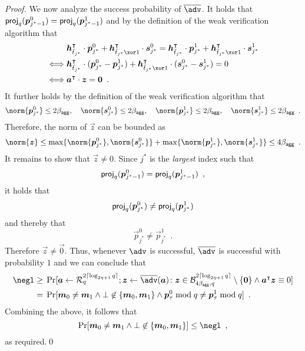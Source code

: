 \begin{proof}
  We now analyze the success probability of $\sisadv$.
  It holds that $\mathsf{proj}_{q}(\boldsymbol{p}_{j^*-1}^0) = \mathsf{proj}_{q}(\boldsymbol{p}_{j^*-1}^1)$ and by the definition of the weak verification algorithm that
  \begin{align*}
    &\vec{h}_{\tilde t_{j^*}}^\transpose\cdot\vec{p}_{j^*}^0 + \vec{h}_{\tilde t_{j^*}\xor 1}^\transpose\cdot\vec{s}_{j^*}^0 = \vec{h}_{\tilde t_{j^*}}^\transpose\cdot\vec{p}_{j^*}^1 + \vec{h}_{\tilde t_{j^*}\xor 1}^\transpose\cdot\vec{s}_{j^*}^1\\
    \iff&\vec{h}_{\tilde t_{j^*}}^\transpose\cdot(\vec{p}_{j^*}^0-\vec{p}_{j^*}^1) + \vec{h}_{\tilde t_{j^*}\xor 1}^\transpose\cdot(\vec{s}_{j^*}^0-\vec{s}_{j^*}^1) = 0\\
    \iff&\vec{a}^\transpose\cdot\vec{z} = \vec{0} \enspace.
  \end{align*}
  It further holds by the definition of the weak verification algorithm that 
  \[
  \norm{\vec{p}_{j^*}^0} \leq 2\bagg,\quad \norm{\vec{s}_{j^*}^0} \leq 2\bagg, \quad\norm{\vec{p}_{j^*}^1} \leq 2\bagg, \quad \norm{\vec{s}_{j^*}^1} \leq 2\bagg\enspace.
  \]
  Therefore, the norm of $\vec{z}$ can be bounded as
  \[
  \norm{\vec{z}} \leq \max\{\norm{\vec{p}_{j^*}^0},\norm{\vec{s}_{j^*}^0}\}+\max\{\norm{\vec{p}_{j^*}^1},\norm{\vec{s}_{j^*}^1}\} \leq 4\bagg\enspace.
  \]
  It remains to show that $\vec{z}\neq 0$.
  Since $j^*$ is the \emph{largest} index such that 
  \[
    \mathsf{proj}_{q}(\boldsymbol{p}_{j^*-1}^0) =  \mathsf{proj}_{q}(\boldsymbol{p}_{j^*-1}^1)\enspace,
  \]
  it holds that
  \[
    \mathsf{proj}_{q}(\boldsymbol{p}_{j^*}^0) \neq \mathsf{proj}_{q}(\boldsymbol{p}_{j^*}^1)
  \]
  and thereby that
  \[
    \vec{p}_{j^*}^0 \neq \vec{p}_{j^*}^1\enspace.
  \]
  Therefore $\vec{z}\neq\vec{0}$.
  Thus, whenever $\adv$ is successful, $\sisadv$ is successful with probability $1$ and we can conclude that
  \begin{align*}
  \negl \geq{}& \Pr[
      \vec{a} \gets \ring_q^{2\normalceil{\log_{2\eta+1} q}}; \vec{z}\gets\sisadv(\vec{a}) \colon \vec{z}\in\ball{4\bagg}{q}^{2\normalceil{\log_{2\eta+1} q}}\setminus\{\vec{0}\} \land \vec{a}^\transpose\vec{z}\equiv 0
    ]\\
    ={}&
    \Pr[\vec{m}_0\neq \vec{m}_1 \land \bot\not\in\{\vec{m}_0,\vec{m}_1\} \land \vec{p}_\tau^0 \bmod q\neq \vec{p}_\tau^1\bmod q]\enspace.
  \end{align*}
  Combining the above, it follows that
  \[
    \Pr[\vec{m}_0\neq \vec{m}_1 \land \bot\not\in\{\vec{m}_0,\vec{m}_1\}] \leq \negl\enspace,
  \]
  as required.\qed
\end{proof}

